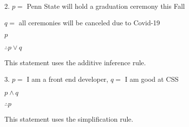 \documentclass{article} %
\begin{document}
    2. $p =$ Penn State will hold a graduation ceremony this Fall
    
    \tabto*{0.98cm}$q =$ all ceremonies will be canceled due to Covid-19

    \hspace*{0cm}

    \tabto*{0.98cm}\underline{\phantom{sf.} $p$ \phantom{d.;}}

    \tabto*{0.98cm}$\therefore p \lor q$

    \tabto*{0.98cm}This statement uses the additive inference rule.
    
    \tabto*{0.98cm}\hspace*{0cm}

    3. $p =$ I am a front end developer, $q =$ I am good at CSS

    \hspace*{0cm}


    \tabto*{0.98cm}\underline{$p \land q$}

    \tabto*{0.98cm}$\therefore p$

    \tabto*{0.98cm}This statement uses the simplification rule.
    
\end{document}
